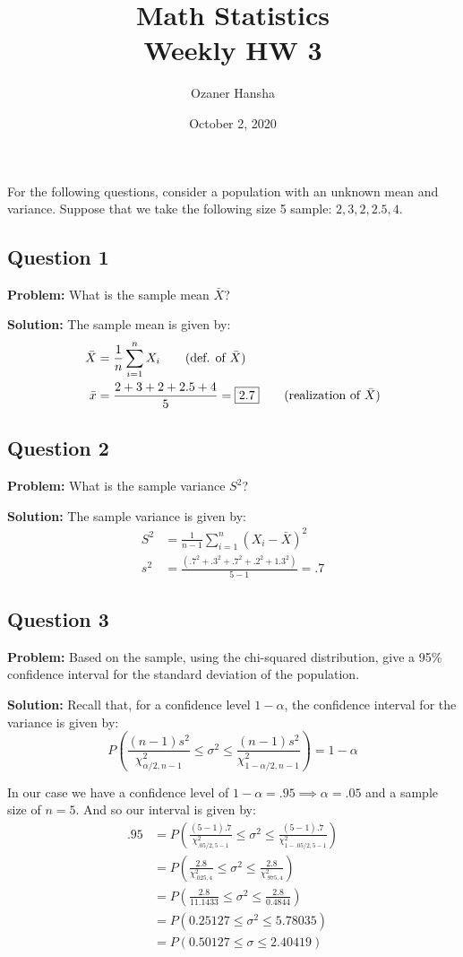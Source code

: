 \documentclass{article}
\begin{document}
\title{Math Statistics\\ Weekly HW 3}
\author{Ozaner Hansha}
\date{October 2, 2020}
\maketitle

For the following questions, consider a population with an unknown mean and variance. Suppose that we take the following size 5 sample: $2,3,2,2.5,4$.

\subsection*{Question 1}
\noindent\textbf{Problem:} What is the sample mean $\bar{X}$?
\bigskip

\noindent\textbf{Solution:} The sample mean is given by:
\begin{align*}
  \bar{X}&=\frac{1}{n}\sum_{i=1}^nX_i\tag{def. of $\bar X$}\\
  \bar x&=\frac{2+3+2+2.5+4}{5}=\boxed{2.7}\tag{realization of $\bar{X}$}
\end{align*}

\subsection*{Question 2}
\noindent\textbf{Problem:} What is the sample variance $S^2$?
\bigskip

\noindent\textbf{Solution:} The sample variance is given by:
\begin{align*}
  S^2&=\frac{1}{n-1}\sum_{i=1}^n(X_i-\bar{X})^2\tag{def. of $S^2$}\\
  s^2&=\frac{(.7^2+.3^2+.7^2+.2^2+1.3^2)}{5-1}=\boxed{.7}\tag{realization of $S^2$}
\end{align*}

\subsection*{Question 3}
\noindent\textbf{Problem:} Based on the sample, using the chi-squared distribution, give a 95\% confidence interval for the standard deviation of the population.
\bigskip

\noindent\textbf{Solution:} Recall that, for a confidence level $1-\alpha$, the confidence interval for the variance is given by:
$$P\left(\frac{(n-1)s^2}{\chi^2_{\alpha/2,n-1}}\le\sigma^2\le\frac{(n-1)s^2}{\chi^2_{1-\alpha/2,n-1}}\right)=1-\alpha$$

In our case we have a confidence level of $1-\alpha=.95\implies\alpha=.05$ and a sample size of $n=5$. And so our interval is given by:
\begin{align*}
  .95&=P\left(\frac{(5-1).7}{\chi^2_{.05/2,5-1}}\le\sigma^2\le\frac{(5-1).7}{\chi^2_{1-.05/2,5-1}}\right)\\
  &=P\left(\frac{2.8}{\chi^2_{.025,4}}\le\sigma^2\le\frac{2.8}{\chi^2_{.975,4}}\right)\\
  &=P\left(\frac{2.8}{11.1433}\le\sigma^2\le\frac{2.8}{	0.4844}\right)\\
  &=P(0.25127\le\sigma^2\le5.78035)\\
  &=\boxed{P(0.50127\le\sigma\le2.40419)}
\end{align*}
\bigskip
\end{document}
